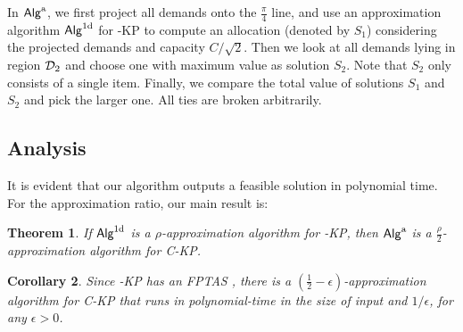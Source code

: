 \documentclass{aamas2013}
\newtheorem{theorem}{Theorem}[section]
\newtheorem{corollary}[theorem]{Corollary}
\begin{document}
In ${\sf Alg}^{\rm a}$, we first project all demands onto the $\frac{\pi}{4}$ line, 
and use an approximation algorithm ${\sf Alg}^{\rm 1d}$ for {-KP} to compute an allocation (denoted by $S_1$) considering the projected demands and capacity $C/\sqrt{2}$.  Then we look at all demands lying in region ${\cal D}_2$ and choose one with maximum value as solution $S_2$.  Note that $S_2$ only consists of a single item.  Finally, we compare the total value of solutions $S_1$ and $S_2$ and pick the larger one.  All ties are broken arbitrarily.   



\subsection{Analysis}
\noindent
It is evident that our algorithm outputs a feasible solution in polynomial time.  For the approximation ratio, our main result is:

\begin{theorem} 
\label{thm:2apx}
If ${\sf Alg}^{\rm 1d}$ is a $\rho$-approximation algorithm for {-KP}, then ${\sf Alg}^{\rm a}$ is a $\frac{\rho}{2}$-approximation algorithm for {\sc C-KP}.
\end{theorem}


\begin{corollary}
\label{cor:2apx}
Since {-KP} has an FPTAS \cite{BKV05KS, KPP10book}, there is a $(\frac{1}{2}-\epsilon)$-approximation algorithm for {\sc C-KP} that runs in polynomial-time in the size of input and $1/\epsilon$, for any $\epsilon>0$.
\end{corollary}   
\end{document}
